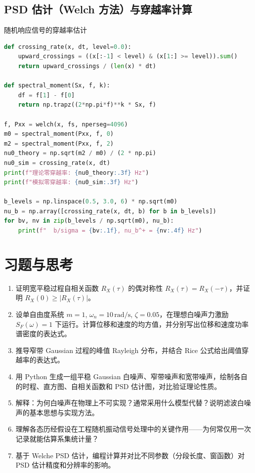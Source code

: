 \subsection{PSD 估计（Welch 方法）与穿越率计算}
\begin{mycode}{随机响应信号的穿越率估计}
\begin{lstlisting}[language=Python]
def crossing_rate(x, dt, level=0.0):
    upward_crossings = ((x[:-1] < level) & (x[1:] >= level)).sum()
    return upward_crossings / (len(x) * dt)

def spectral_moment(Sx, f, k):
    df = f[1] - f[0]
    return np.trapz((2*np.pi*f)**k * Sx, f)

f, Pxx = welch(x, fs, nperseg=4096)
m0 = spectral_moment(Pxx, f, 0)
m2 = spectral_moment(Pxx, f, 2)
nu0_theory = np.sqrt(m2 / m0) / (2 * np.pi)
nu0_sim = crossing_rate(x, dt)
print(f"理论零穿越率: {nu0_theory:.3f} Hz")
print(f"模拟零穿越率: {nu0_sim:.3f} Hz")

b_levels = np.linspace(0.5, 3.0, 6) * np.sqrt(m0)
nu_b = np.array([crossing_rate(x, dt, b) for b in b_levels])
for bv, nv in zip(b_levels / np.sqrt(m0), nu_b):
    print(f"  b/sigma = {bv:.1f}, nu_b^+ = {nv:.4f} Hz")
\end{lstlisting}
\end{mycode}

\section{习题与思考}
\begin{enumerate}
    \item 证明宽平稳过程自相关函数 $R_X(\tau)$ 的偶对称性 $R_X(\tau) = R_X(-\tau)$，并证明 $R_X(0) \ge |R_X(\tau)|$。
    \item 设单自由度系统 $m=1$, $\omega_n=10\,\text{rad/s}$, $\zeta=0.05$，在理想白噪声力激励 $S_F(\omega)=1$ 下运行。计算位移和速度的均方值，并分别写出位移和速度功率谱密度的表达式。
    \item 推导窄带 Gaussian 过程的峰值 Rayleigh 分布，并结合 Rice 公式给出阈值穿越率的表达式。
    \item 用 Python 生成一组平稳 Gaussian 白噪声、窄带噪声和宽带噪声，绘制各自的时程、直方图、自相关函数和 PSD 估计图，对比验证理论性质。
    \item 解释：为何白噪声在物理上不可实现？通常采用什么模型代替？说明滤波白噪声的基本思想与实现方法。
    \item 理解各态历经假设在工程随机振动信号处理中的关键作用——为何常仅用一次记录就能估算系集统计量？
    \item 基于 Welche PSD 估计，编程计算并对比不同参数（分段长度、窗函数）对 PSD 估计精度和分辨率的影响。
\end{enumerate}
